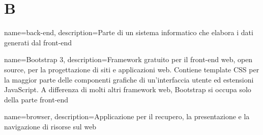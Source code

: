 \newpage
\section{B}

{
	name=back-end,
	description={Parte di un sistema informatico che elabora i dati generati dal front-end}
}

{
	name=Bootstrap 3,
	description={Framework gratuito per il front-end web, open source, per la progettazione di siti e applicazioni web. Contiene template CSS per la maggior parte delle componenti grafiche di un'interfaccia utente ed estensioni JavaScript. A differenza di molti altri framework web, Bootstrap si occupa solo della parte front-end}
}

{
	name=browser,
	description={Applicazione per il recupero, la presentazione e la navigazione di risorse sul web}
}